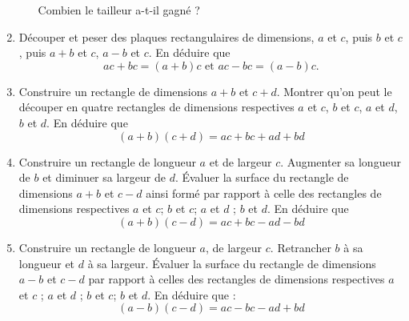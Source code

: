 \begin{enumerate}
\begin{enumerate}
Combien le tailleur a-t-il gagné ? 
\end{enumerate}
\item Découper et peser des plaques rectangulaires de dimensions, $a$ et $c$, puis $b$ et $c$, puis 
$a+b$ et $c$, $a-b$ et $c$. En déduire que 
\[ ac + bc = (a + b)c\text{    et    } ac - bc = (a - b) c.\]
\item Construire un rectangle de dimensions $a + b$ 
et $c + d$. Montrer qu'on peut le découper en quatre
rectangles de dimensions respectives $a$ et $c$, 
$b$ et $c$, $a$ et $d$, $b$ et $d$. En déduire que 
\[ (a + b)(c + d) = ac + bc + ad + bd\]
\item Construire un rectangle de longueur $a$ et de
largeur $c$. Augmenter sa longueur de $b$ et 
diminuer sa largeur de $d$. Évaluer la surface du 
rectangle de dimensions $a + b$ et $c - d$ ainsi 
formé par rapport à celle des rectangles de dimensions
respectives $a$ et $c$; $b$ et $c$; $a$ et $d$ ; $b$
et $d$. En déduire que 
\[ (a + b)(c - d) = ac + bc - ad - bd\]
\item Construire un rectangle de longueur $a$, 
de largeur $c$. Retrancher $b$ à sa longueur et 
$d$ à sa largeur. Évaluer la surface du rectangle 
de dimensions $a - b$ et $c - d$ par rapport à 
celles des rectangles de dimensions respectives 
$a$ et $c$ ; $a$ et $d$ ; $b$ et $c$; $b$ et $d$. 
En déduire que : 
\[ (a - b)(c - d) = ac - bc - ad + bd\]

 \end{enumerate}